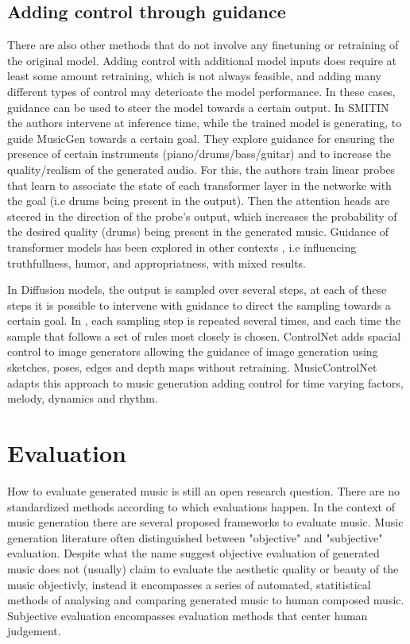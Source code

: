 \subsection{Adding control through guidance}
There are also other methods that do not involve any finetuning or retraining of the original model. Adding control with additional model inputs does require at least some amount retraining, which is not always feasible, and adding many different types of control may deterioate the model performance. In these cases, guidance can be used to steer the model towards a certain output.
In SMITIN \cite{Koo_Wichern_Germain_SMITIN_2024} the authors intervene at inference time, while the trained model is generating, to guide MusicGen\cite{copet2023simple}  towards a certain goal. They explore guidance for ensuring the presence of certain instruments (piano/drums/bass/guitar) and to increase the quality/realism of the generated audio. For this,  the authors train linear probes that learn to associate the state of each transformer layer in the networke with the goal (i.e drums being present in the output). Then the attention heads are steered in the direction of the probe’s output, which increases the probability of the desired quality (drums) being present in the generated music. Guidance of transformer models has been explored in other contexts \cite{language_guide_rutte_2024}, i.e influencing truthfullness, humor, and appropriatness, with mixed results. 

In Diffusion models, the output is sampled over several steps, at each of these steps it is possible to intervene with guidance to direct the sampling towards a certain goal. In \cite{Huang_rule_diffusion_2024}, each sampling step is repeated several times, and each time the sample that follows a set of rules most closely is chosen. ControlNet \cite{Zhang_Rao_Agrawala_2023} adds spacial control to image generators allowing the guidance of image generation using sketches, poses, edges and depth maps without retraining. MusicControlNet \cite{Wu_Donahue_musicontrolnet_2023} adapts this approach to music generation adding control for time varying factors, melody, dynamics and rhythm. 


\section{Evaluation} \label{section:evaluation}
How to evaluate generated music is still an open research question. There are no standardized methods according to which evaluations happen\cite{Yin_Reuben_Stepney_Collins_2023}. In the context of music generation there are several proposed frameworks to evaluate music. Music generation literature often distinguished between "objective" and "subjective" evaluation. Despite what the name suggest objective evaluation of generated music does not (usually) claim to evaluate the aesthetic quality or beauty of the music objectivly, instead it encompasses a series of automated, statitistical methods of analysing and comparing generated music to human composed music. Subjective evaluation encompasses evaluation methods that center human judgement. \\


